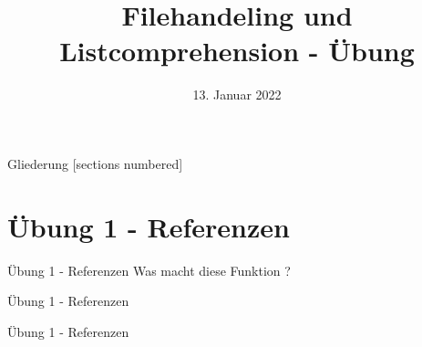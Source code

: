 



\title{Filehandeling und Listcomprehension - Übung}
\date{13. Januar 2022}


\maketitle

\begin{frame}{Gliederung}
	[sections numbered]
	\tableofcontents
\end{frame}

\section{Übung 1 - Referenzen}
\begin{frame}{Übung 1 - Referenzen}
	Was macht diese Funktion ?
	
\end{frame}
\begin{frame}{Übung 1 - Referenzen}
	
\end{frame}
\begin{frame}{Übung 1 - Referenzen}
	
\end{frame}

